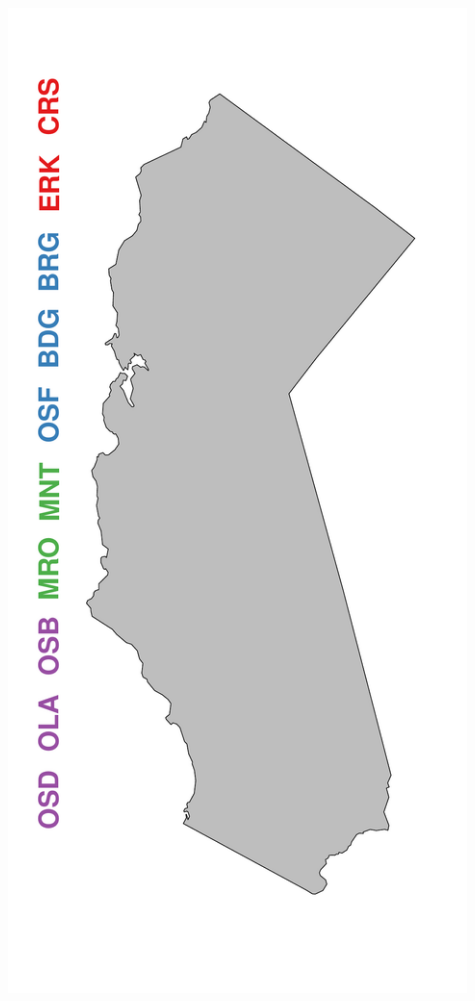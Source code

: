 \documentclass[a0paper,portrait]{baposter}
\begin{document}
\begin{poster}
{\begin{minipage}[h!]{0.19\textwidth}
	        \includegraphics[width=0.91\textwidth]{../pictures/mapFullConcMend.pdf}
	\end{minipage}	
	\begin{minipage}[h!]{0.19\textwidth}
	        \hspace*{0.5cm}                %

\end{minipage}}
\end{poster}
\end{document}
